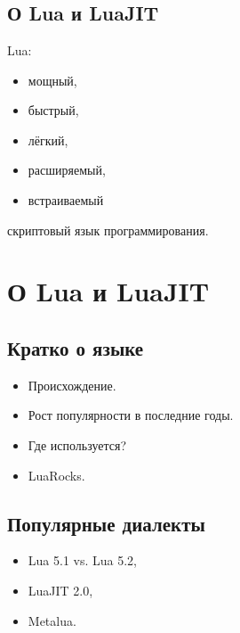 \documentclass[aspectratio=169,handout,bigger]{beamer}
\begin{document}

\section*{}
\subsection*{О Lua и LuaJIT}

\begin{frame}{}
  Lua:
  \begin{itemize}
    \item мощный,
    \item быстрый,
    \item лёгкий,
    \item расширяемый,
    \item встраиваемый
  \end{itemize}
  скриптовый язык программирования.
\end{frame}


\section{О Lua и LuaJIT}
\subsection*{Кратко о языке}

\begin{frame}
  \begin{itemize}
    \item Происхождение.
    \item Рост популярности в последние годы.
    \item Где используется?
    \item LuaRocks.
  \end{itemize}
\end{frame}


\subsection*{Популярные диалекты}

\begin{frame}
  \begin{itemize}
    \item Lua 5.1 vs. Lua 5.2,
    \item LuaJIT 2.0,
    \item Metalua.
  \end{itemize}
\end{frame}
\end{document}
